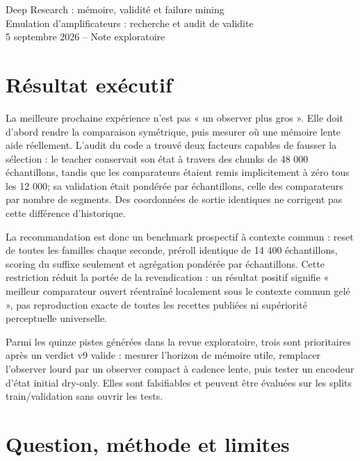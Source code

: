 \documentclass[10pt,a4paper]{article}
\begin{document}
\begin{center}\Large Deep Research : m\'{e}moire, validit\'{e} et failure mining\\
\large Emulation d'amplificateurs : recherche et audit de validite\\
\normalsize 5 septembre 2026 -- Note exploratoire\end{center}
\tableofcontents
\newpage


\section{R\'{e}sultat ex\'{e}cutif}

La meilleure prochaine exp\'{e}rience n'est pas « un observer plus gros ». Elle doit
d'abord rendre la comparaison sym\'{e}trique, puis mesurer o\`{u} une m\'{e}moire lente aide
r\'{e}ellement. L'audit du code a trouv\'{e} deux facteurs capables de fausser la s\'{e}lection :
le teacher conservait son \'{e}tat \`{a} travers des chunks de 48 000 \'{e}chantillons, tandis
que les comparateurs \'{e}taient remis implicitement \`{a} z\'{e}ro tous les 12 000; sa
validation \'{e}tait pond\'{e}r\'{e}e par \'{e}chantillons, celle des comparateurs par nombre de
segments. Des coordonn\'{e}es de sortie identiques ne corrigent pas cette diff\'{e}rence
d'historique.

La recommandation est donc un benchmark prospectif \`{a} contexte commun : reset de
toutes les familles chaque seconde, pr\'{e}roll identique de 14 400 \'{e}chantillons,
scoring du suffixe seulement et agr\'{e}gation pond\'{e}r\'{e}e par \'{e}chantillons. Cette
restriction r\'{e}duit la port\'{e}e de la revendication : un r\'{e}sultat positif signifie
« meilleur comparateur ouvert r\'{e}entra\^{i}n\'{e} localement sous le contexte commun
gel\'{e} », pas reproduction exacte de toutes les recettes publi\'{e}es ni sup\'{e}riorit\'{e}
perceptuelle universelle.

Parmi les quinze pistes g\'{e}n\'{e}r\'{e}es dans la revue exploratoire, trois sont prioritaires
apr\`{e}s un verdict v9 valide : mesurer l'horizon de m\'{e}moire utile, remplacer
l'observer lourd par un observer compact \`{a} cadence lente, puis tester un encodeur
d'\'{e}tat initial dry-only. Elles sont falsifiables et peuvent \^{e}tre \'{e}valu\'{e}es sur les
splits train/validation sans ouvrir les tests.

\section{Question, m\'{e}thode et limites}
\end{document}

